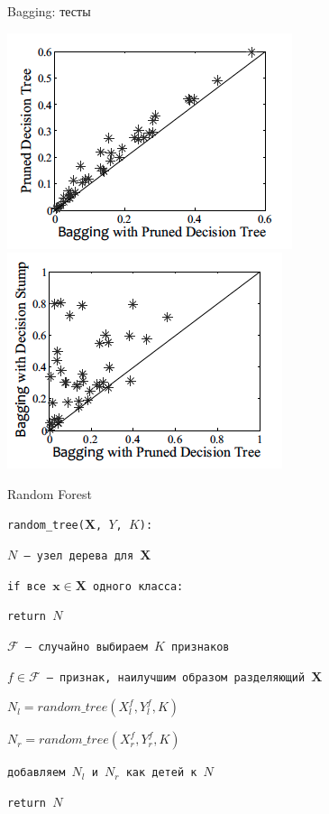 \documentclass[10pt,a4paper]{beamer}
\begin{document}
\begin{frame}{Bagging: тесты}

\begin{center}
\includegraphics[scale=0.4]{images/bag1.png}\;
\includegraphics[scale=0.4]{images/bag2.png}
\end{center}

\end{frame}


\begin{frame}{Random Forest}

\texttt{random\_tree($\mathbf{X}$, $Y$, $K$):}

\texttt{\quad $N$ -- узел дерева для $\mathbf{X}$}

\texttt{\quad if все $\mathbf{x} \in \mathbf{X}$ одного класса:}

\texttt{\quad\quad return $N$}

\texttt{\quad $\mathcal{F}$ -- случайно выбираем $K$ признаков}

\texttt{\quad $f \in \mathcal{F}$ -- признак, наилучшим образом разделяющий $\mathbf{X}$}

\texttt{\quad $N_l = random\_tree(X_l^f, Y_l^f, K)$ }

\texttt{\quad $N_r = random\_tree(X_r^f, Y_r^f, K)$ }

\texttt{\quad добавляем $N_l$ и $N_r$ как детей к $N$}

\texttt{\quad return $N$}

\end{frame}
\end{document}
